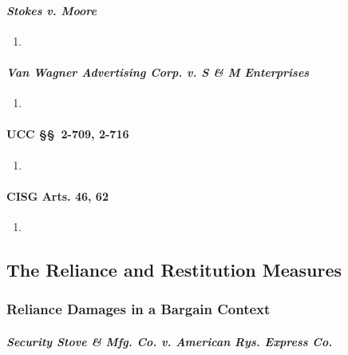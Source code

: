 \paragraph{\emph{Stokes v. Moore}}

\begin{enumerate}
    \item %
\end{enumerate}

\paragraph{\emph{Van Wagner Advertising Corp. v. S \& M Enterprises}}

\begin{enumerate}
    \item %
\end{enumerate}

\paragraph{UCC \S\S\ 2-709, 2-716}

\begin{enumerate}
    \item %
\end{enumerate}

\paragraph{CISG Arts. 46, 62}

\begin{enumerate}
    \item %
\end{enumerate}

\subsection{The Reliance and Restitution Measures}

\subsubsection{Reliance Damages in a Bargain Context}

\paragraph{\emph{Security Stove \& Mfg. Co. v. American Rys. Express Co.}}

